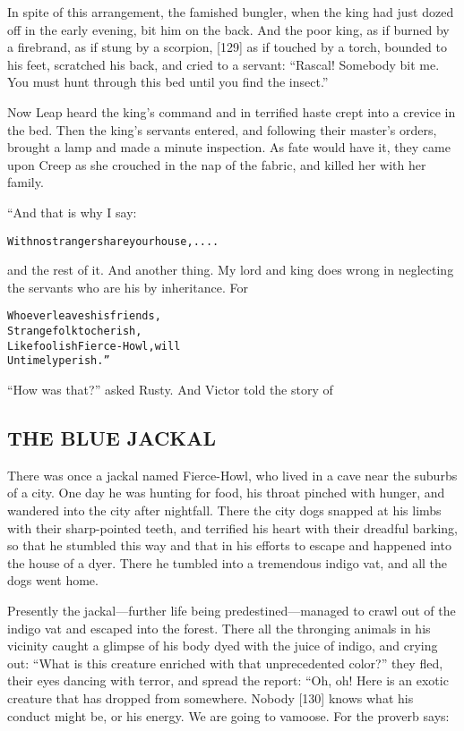 \documentclass{article}
\renewenvironment{verbatim}{\begin{alltt}\normalfont\begin{centering}}{\end{centering}\end{alltt}}
\begin{document}
In spite of this arrangement, the famished bungler, when the king
had just dozed off in the early evening, bit him on the back. And
the poor king, as if burned by a firebrand, as if stung by a
scorpion, [129] as if touched by a torch, bounded to his feet,
scratched his back, and cried to a servant:
``Rascal! Somebody bit me. You must hunt through this bed until you find the insect.''

Now Leap heard the king's command and in terrified haste crept into
a crevice in the bed. Then the king's servants entered, and
following their master's orders, brought a lamp and made a minute
inspection. As fate would have it, they came upon Creep as she
crouched in the nap of the fabric, and killed her with her family.

“And that is why I say:

\begin{verbatim}
With no stranger share your house, ....
\end{verbatim}
and the rest of it. And another thing. My lord and king does wrong
in neglecting the servants who are his by inheritance. For

\begin{verbatim}
Whoever leaves his friends,
    Strange folk to cherish,
Like foolish Fierce-Howl, will
    Untimely perish.”
\end{verbatim}
``How was that?'' asked Rusty. And Victor told the story of

\subsection{THE BLUE JACKAL}

There was once a jackal named Fierce-Howl, who lived in a cave near
the suburbs of a city. One day he was hunting for food, his throat
pinched with hunger, and wandered into the city after nightfall.
There the city dogs snapped at his limbs with their sharp-pointed
teeth, and terrified his heart with their dreadful barking, so that
he stumbled this way and that in his efforts to escape and happened
into the house of a dyer. There he tumbled into a tremendous indigo
vat, and all the dogs went home.

Presently the jackal---further life being predestined---managed to
crawl out of the indigo vat and escaped into the forest. There all
the thronging animals in his vicinity caught a glimpse of his body
dyed with the juice of indigo, and crying out:
``What is this creature enriched with that unprecedented color?''
they fled, their eyes dancing with terror, and spread the report:
“Oh, oh! Here is an exotic creature that has dropped from
somewhere. Nobody [130] knows what his conduct might be, or his
energy. We are going to vamoose. For the proverb says:
\end{document}
